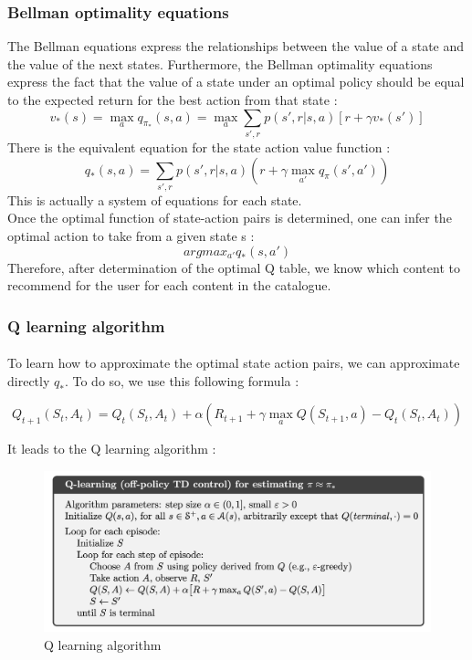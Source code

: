 \documentclass[a4paper]{article}
\begin{document}
\subsubsection{Bellman optimality equations}

The Bellman equations express the relationships between the value of a state and the value of the next states. 
Furthermore, the Bellman optimality equations express the fact that the value of a state under an optimal policy should be equal to the expected return for the best action from that state : 
\[  v_{*}(s)  = \max_{a} q_{\pi_{*}}(s,a)   = \max_{a} \sum_{s',r} p(s',r | s,a) [r + \gamma v_{*}(s')]                \]
There is the equivalent equation for the state action value function : 
\[  q_{*}(s,a) = \sum_{s', r} p(s',r |s,a) (r + \gamma \max_{a'} q_{\pi}(s',a')    )        \]
This is actually a system of equations for each state. \\
Once the optimal function of state-action pairs is determined, one can infer the optimal action to take from a given state s  : 
\[   argmax_{a'} q_{*}(s,a')                \]
Therefore, after determination of the optimal Q table, we know which content to recommend for the user for each content in the catalogue.

\subsubsection{Q learning algorithm}
\paragraph{} To learn how to approximate the optimal state action pairs, we can approximate directly $q_{*}$. To do so, we use this following formula : 

\[   Q_{t+1}(S_t, A_t) =   Q_{t}(S_t, A_t) + \alpha (R_{t+1} + \gamma \max_{a} Q(S_{t+1} , a) - Q_{t}(S_t, A_t)        )            \]

It leads to the Q learning algorithm : 

\begin{figure}[h!]
\begin{center}
\includegraphics[width=1.2\linewidth]{img/qlearning.png}
\caption{Q learning algorithm}
\end{center}
\end{figure}
\end{document}
